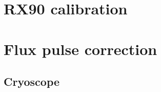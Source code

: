 \section{RX90 calibration}

\section{Flux pulse correction}
\subsection{Cryoscope}
\cite{Cryoscope}
\begin{comment}
    TO DO LIST:
    * calcoli analitic per assunzioni del cryoscope
    * calcoli analitici di convoluzioni per dimostrare che è giusto il modo in cui combiniamo i filtri
    * costruire script per analisi dati
    * eventualmente provare ad aggiungere più correzioni esponenziali
\end{comment}
